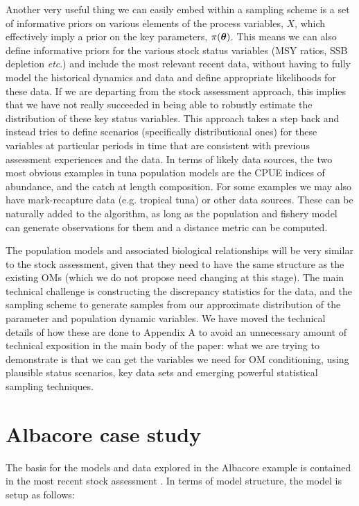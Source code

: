 \documentclass[11pt]{article}
\newcommand{\xtheta}{\mbox{\boldmath$\theta$}}
\begin{document}
Another very useful thing we can easily embed within a sampling scheme is a set of informative priors on various elements of the process variables, $X$, which effectively imply a prior on the key parameters, $\pi(\xtheta)$. This means we can also define informative priors for the various stock status variables (MSY ratios, SSB depletion \textit{etc}.) and include the most relevant recent data, without having to fully model the historical dynamics and data and define appropriate likelihoods for these data. If we are departing from the stock assessment approach, this implies that we have not really succeeded in being able to robustly estimate the distribution of these key status variables. This approach takes a step back and instead tries to define scenarios (specifically distributional ones) for these variables at particular periods in time that are consistent with previous assessment experiences and the data. In terms of likely data sources, the two most obvious examples in tuna population models are the CPUE indices of abundance, and the catch at length composition. For some examples we may also have mark-recapture data (e.g. tropical tuna) or other data sources. These can be naturally added to the algorithm, as long as the population and fishery model can generate observations for them and a distance metric can be computed.

The population models and associated biological relationships will be very similar to the stock assessment, given that they need to have the same structure as the existing OMs (which we do not propose need changing at this stage). The main technical challenge is constructing the discrepancy statistics for the data, and the sampling scheme to generate samples from our approximate distribution of the parameter and population dynamic variables. We have moved the technical details of how these are done to Appendix A to avoid an unnecessary amount of technical exposition in the main body of the paper: what we are trying to demonstrate is that we can get the variables we need for OM conditioning, using plausible status scenarios, key data sets and emerging powerful statistical sampling techniques.

\section{Albacore case study}

The basis for the models and data explored in the Albacore example is contained in the most recent stock assessment \cite{albsa}. In terms of model structure, the model is setup as follows:
\end{document}
